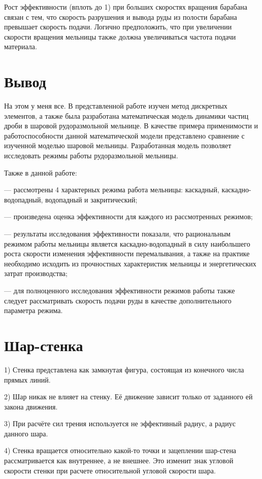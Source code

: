 \documentclass[a4paper]{article}
\begin{document}
Рост эффективности (вплоть до 1) при больших скоростях вращения барабана связан с тем, что скорость разрушения и вывода руды из полости барабана превышает скорость подачи.
Логично предположить, что при увеличении скорости вращения мельницы также должна увеличиваться частота подачи материала.


\section{Вывод}

На этом у меня все.
В представленной работе изучен метод дискретных элементов, а также была разработана математическая модель динамики частиц дроби в шаровой рудоразмольной мельнице.
В качестве примера применимости и работоспособности данной математической модели представлено сравнение с изученной моделью шаровой мельницы.
Разработанная модель позволяет исследовать режимы работы рудоразмольной мельницы.

Также в данной работе:

	--- рассмотрены 4 характерных режима работа мельницы: каскадный, каскадно-водопадный, водопадный и закритический;

	--- произведена оценка эффективности для каждого из рассмотренных режимов;

	--- результаты исследования эффективности показали, что рациональным режимом работы мельницы является каскадно-водопадный в силу наибольшего роста скорости изменения эффективности перемалывания, а также на практике необходимо исходить из прочностных характеристик мельницы и энергетических затрат производства;
	
	--- для полноценного исследования эффективности режимов работы также следует рассматривать скорость подачи руды в качестве дополнительного параметра режима.


\section{Шар-стенка}

1) Стенка представлена как замкнутая фигура, состоящая из конечного числа прямых линий.

2) Шар никак не влияет на стенку. 
Её движение зависит только от заданного ей закона движения.

3) При расчёте сил трения используется не эффективный радиус, а радиус данного шара.

4) Стенка вращается относительно какой-то точки и зацеплении шар-стена рассматривается как внутреннее, а не внешнее. 
Это изменит знак угловой скорости стенки при расчете относительной угловой скорости шара.
\end{document}
